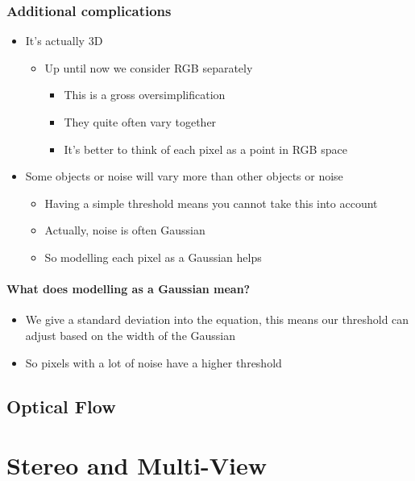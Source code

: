 \documentclass[a4paper]{article}
\begin{document}
\subsubsection{Additional complications}
\label{sec-4-1-4}
\begin{itemize}
\item It's actually 3D
\begin{itemize}
\item Up until now we consider RGB separately
\begin{itemize}
\item This is a gross oversimplification
\item They quite often vary together
\item It's better to think of each pixel as a point in RGB space
\end{itemize}
\end{itemize}
\item Some objects or noise will vary more than other objects or noise
\begin{itemize}
\item Having a simple threshold means you cannot take this into account
\item Actually, noise is often Gaussian
\item So modelling each pixel as a Gaussian helps
\end{itemize}
\end{itemize}

\paragraph{What does modelling as a Gaussian mean?}
\label{sec-4-1-4-1}
\begin{itemize}
\item We give a standard deviation into the equation, this means our threshold can adjust based on the width of the Gaussian
\item So pixels with a lot of noise have a higher threshold
\end{itemize}

\subsection{Optical Flow}
\label{sec-4-2}

\section{Stereo and Multi-View}
\label{sec-5}
\end{document}
